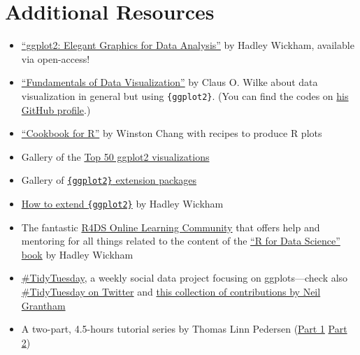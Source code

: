 \documentclass[
  letterpaper,
  DIV=11,
  numbers=noendperiod]{scrreprt}
\providecommand{\tightlist}{%
  \setlength{\itemsep}{0pt}\setlength{\parskip}{0pt}}\usepackage{longtable,booktabs,array}
\begin{document}
\section*{Additional Resources}\label{additional-resources}


\begin{itemize}
\tightlist
\item
  \href{https://ggplot2-book.org/}{``ggplot2: Elegant Graphics for Data
  Analysis''} by Hadley Wickham, available via open-access!
\item
  \href{http://serialmentor.com/dataviz/}{``Fundamentals of Data
  Visualization''} by Claus O. Wilke about data visualization in general
  but using \texttt{\{ggplot2\}}. (You can find the codes on
  \href{https://github.com/clauswilke/dataviz}{his GitHub profile}.)
\item
  \href{http://www.cookbook-r.com/Graphs/}{``Cookbook for R''} by
  Winston Chang with recipes to produce R plots
\item
  Gallery of the
  \href{http://r-statistics.co/Top50-Ggplot2-Visualizations-MasterList-R-Code.html}{Top
  50 ggplot2 visualizations}
\item
  Gallery of
  \href{https://exts.ggplot2.tidyverse.org/gallery/}{\texttt{\{ggplot2\}}
  extension packages}
\item
  \href{https://cran.r-project.org/web/packages/ggplot2/vignettes/extending-ggplot2.html}{How
  to extend \texttt{\{ggplot2\}}} by Hadley Wickham
\item
  The fantastic \href{https://www.rfordatasci.com/}{R4DS Online Learning
  Community} that offers help and mentoring for all things related to
  the content of the \href{r4ds.had.co.nz/}{``R for Data Science'' book}
  by Hadley Wickham
\item
  \href{https://github.com/rfordatascience/tidytuesday}{\#TidyTuesday},
  a weekly social data project focusing on ggplots---check also
  \href{https://twitter.com/hashtag/TidyTuesday?lang=en}{\#TidyTuesday
  on Twitter} and \href{https://nsgrantham.com/tidytuesdayrocks/}{this
  collection of contributions by Neil Grantham}
\item
  A two-part, 4.5-hours tutorial series by Thomas Linn Pedersen
  (\href{https://www.youtube.com/watch?v=h29g21z0a68}{Part 1} \textbar{}
  \href{https://www.youtube.com/watch?v=0m4yywqNPVY}{Part 2})
\end{itemize}
\end{document}
